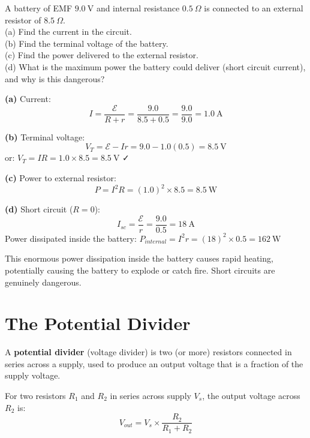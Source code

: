 \begin{examplebox}[23.5]
A battery of EMF $9.0\ \text{V}$ and internal
resistance $0.5\ \Omega$ is connected to an external
resistor of $8.5\ \Omega$.\\
(a) Find the current in the circuit.\\
(b) Find the terminal voltage of the battery.\\
(c) Find the power delivered to the external resistor.\\
(d) What is the maximum power the battery could
deliver (short circuit current), and why is this
dangerous?
\end{examplebox}

\begin{solutionbox}
\textbf{(a)} Current:
\[
  I = \frac{\mathcal{E}}{R+r}
  = \frac{9.0}{8.5+0.5} = \frac{9.0}{9.0}
  = 1.0\ \text{A}
\]

\textbf{(b)} Terminal voltage:
\[
  V_T = \mathcal{E} - Ir = 9.0 - 1.0(0.5)
  = 8.5\ \text{V}
\]
or: $V_T = IR = 1.0 \times 8.5 = 8.5\ \text{V}$ ✓

\textbf{(c)} Power to external resistor:
\[
  P = I^2R = (1.0)^2 \times 8.5 = 8.5\ \text{W}
\]

\textbf{(d)} Short circuit ($R = 0$):
\[
  I_{sc} = \frac{\mathcal{E}}{r}
  = \frac{9.0}{0.5} = 18\ \text{A}
\]
Power dissipated inside the battery:
$P_{internal} = I^2 r = (18)^2 \times 0.5 = 162\ \text{W}$

This enormous power dissipation inside the battery
causes rapid heating, potentially causing the
battery to explode or catch fire. Short circuits
are genuinely dangerous.
\end{solutionbox}

\section{The Potential Divider}

\begin{definitionbox}
A \textbf{potential divider} (voltage divider) is
two (or more) resistors connected in series across
a supply, used to produce an output voltage that
is a fraction of the supply voltage.

For two resistors $R_1$ and $R_2$ in series across
supply $V_s$, the output voltage across $R_2$ is:
\[
  V_{out} = V_s \times \frac{R_2}{R_1 + R_2}
\]
\end{definitionbox}

